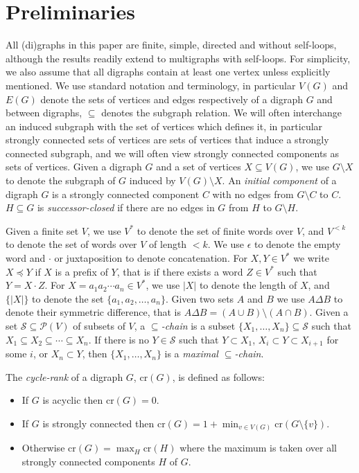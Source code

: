 \documentclass{llncs}
\newcommand{\letters}[1]{\{\!|#1|\!\}}
\newcommand{\cycr}[1]{\textrm{cr}(#1)}
\begin{document}
\section{Preliminaries}\label{sec:prelim}
All (di)graphs in this paper are finite, simple, directed and without self-loops, although the results readily extend to multigraphs with self-loops.  For simplicity, we also assume that all digraphs contain at least one vertex unless explicitly mentioned.  We use standard notation and terminology, in particular $V(G)$ and $E(G)$ denote the sets of vertices and edges respectively of a digraph $G$ and between digraphs, $\subseteq$ denotes the subgraph relation.  We will often interchange an induced subgraph with the set of vertices which defines it, in particular strongly connected sets of vertices are sets of vertices that induce a strongly connected subgraph, and we will often view strongly connected components as sets of vertices.  Given a digraph $G$ and a set of vertices $X \subseteq V(G)$, we use $G \setminus X$ to denote the subgraph of $G$ induced by $V(G) \setminus X$.  An \emph{initial component} of a digraph $G$ is a strongly connected component $C$ with no edges from $G\setminus C$ to $C$.  $H \subseteq G$ is \emph{successor-closed} if there are no edges in $G$ from $H$ to $G \setminus H$.

Given a finite set $V$, we use $V^*$ to denote the set of finite words over $V$, and $V^{< k}$ to denote the set of words over $V$ of length $< k$.  We use $\epsilon$ to denote the empty word and $\cdot$ or juxtaposition to denote concatenation.  For $X,Y \in V^*$ we write $X \preceq Y$ if $X$ is a prefix of $Y$, that is if there exists a word $Z \in V^*$ such that $Y = X\cdot Z$.  For $X=a_1a_2\cdots a_n\in V^*$, we use $|X|$ to denote the length of $X$, and $\letters{X}$ to denote the set $\{a_1, a_2, \ldots, a_n\}$.  Given two sets $A$ and $B$ we use $A \Delta B$ to denote their symmetric difference, that is $A \Delta B = (A \cup B) \setminus (A \cap B)$.  Given a set $\mathcal{S} \subseteq \mathcal{P}(V)$ of subsets of $V$, a \emph{$\subseteq$-chain} is a subset $\{X_1,\ldots, X_n\} \subseteq \mathcal{S}$ such that $X_1 \subseteq X_2 \subseteq \cdots \subseteq X_n$.  If there is no $Y \in \mathcal{S}$ such that $Y \subset X_1$, $X_i \subset Y \subset X_{i+1}$ for some $i$, or $X_n \subset Y$, then $\{X_1, \ldots, X_n\}$ is a \emph{maximal $\subseteq$-chain}.

The \emph{cycle-rank} of a digraph $G$, $\cycr{G}$, is defined as follows:
\begin{itemize}
\item If $G$ is acyclic then $\cycr{G}=0$.
\item If $G$ is strongly connected then $\cycr{G} = 1 + \min_{v \in V(G)} \cycr{G \setminus \{v\}}$.
\item Otherwise $\cycr{G} = \max_H \cycr{H}$ where the maximum is taken over all strongly connected components $H$ of $G$.
\end{itemize}
\end{document}
